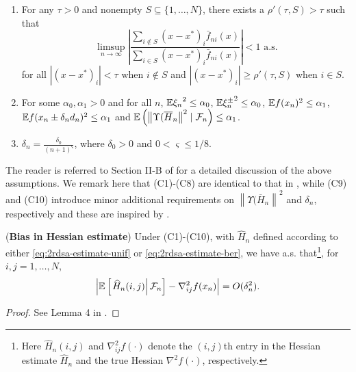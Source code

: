 \begin{enumerate}[label=(\textbf{C\arabic*})]
\item For any $\tau >0$ and nonempty $S \subseteq \{1,\ldots,N\}$, there exists a $\rho'(\tau,S)>\tau$ such that 
$$ \limsup_{n\rightarrow \infty} \left| \dfrac{\sum_{i \notin S} (x-x^*)_i \bar f_{ni}(x)}{\sum_{i \in S} (x-x^*)_i \bar f_{ni}(x)}               \right| < 1 \text{ a.s.}$$
for all $|(x-x^*)_i| < \tau$ when $i \notin S$ and $|(x-x^*)_i| \ge \rho'(\tau,S)$ when $i\in S$.
\item For some $\alpha_0, \alpha_1>0$ and for all $n$, $\mathbb{E} {\xi_n}^{2} \le \alpha_0$, $\mathbb{E} {\xi_n^{\pm}}^{2} \le \alpha_0$, $\mathbb{E} f(x_n)^{2} \le \alpha_1$,  $\mathbb{E} f(x_n\pm \delta_n d_n)^{2} \le \alpha_1$ and $\mathbb{E} \left(\left\| \Upsilon(\overline H_n \right\|^2 \mid \mathcal{F}_n\right) \le \alpha_1$. 
\item  $\delta_n = \frac{\delta_0}{(n+1)^{\varsigma}}$, where $\delta_0 > 0$ and $0 < \varsigma \le 1/8$.
\end{enumerate}
The reader is referred to Section II-B of \cite{prashanth2015rdsa} for a detailed discussion of the above assumptions. We remark here that (C1)-(C8) are identical to that in \cite{prashanth2015rdsa}, while (C9) and (C10) introduce minor additional requirements on $\left\| \Upsilon(\overline H_n \right\|^2$ and $\delta_n$, respectively and these are inspired by \cite{spall-jacobian}.

\begin{lemma}(\textbf{Bias in Hessian estimate})
\label{lemma:2rdsa-bias}
Under (C1)-(C10), with $\widehat H_n$ defined according to either \eqref{eq:2rdsa-estimate-unif} or \eqref{eq:2rdsa-estimate-ber}, we have a.s. that\footnote{Here $\widehat H_n(i,j)$ and $\nabla^2_{ij}f(\cdot)$ denote the $(i,j)$th entry in the Hessian estimate $\widehat H_n$ and the true Hessian $\nabla^2 f(\cdot)$, respectively.}, for $i,j = 1,\ldots,N$,
\begin{align}
\left|\mathbb{E}\left[
\left. \widehat H_n(i,j) \right| \mathcal{F}_n \right] - \nabla^2_{ij} f(x_n)\right| = O(\delta_n^2).
\end{align} 
\end{lemma}
\begin{proof}
See Lemma 4 in \cite{prashanth2015rdsa}.
\end{proof}

